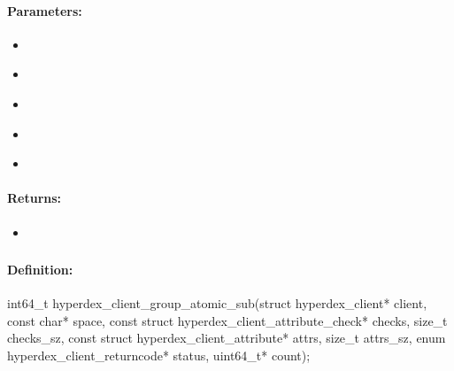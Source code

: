 \paragraph{Parameters:}
\begin{itemize}[noitemsep]
\item {}\\

\item {}\\

\item {}\\

\item {}\\

\item {}\\

\end{itemize}

\paragraph{Returns:}
\begin{itemize}[noitemsep]
\item {}\\

\end{itemize}

\pagebreak
\subsubsection{}
\label{api:c:group_atomic_sub}


\paragraph{Definition:}
\begin{ccode}
int64_t hyperdex_client_group_atomic_sub(struct hyperdex_client* client,
        const char* space,
        const struct hyperdex_client_attribute_check* checks, size_t checks_sz,
        const struct hyperdex_client_attribute* attrs, size_t attrs_sz,
        enum hyperdex_client_returncode* status,
        uint64_t* count);
\end{ccode}

